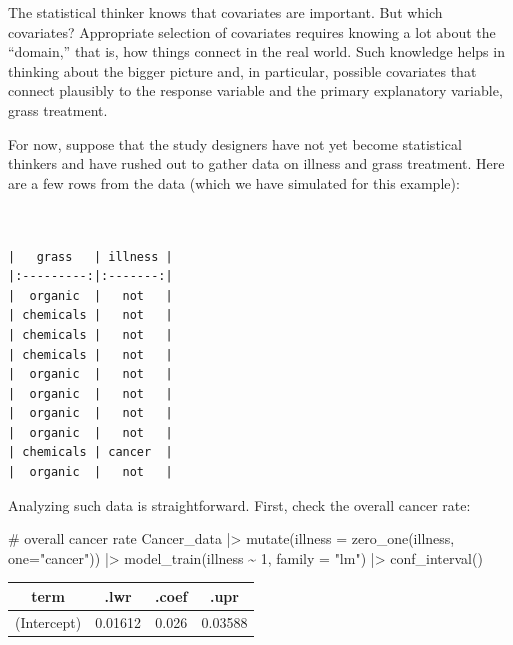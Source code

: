 \documentclass[
  letterpaper,
  DIV=11,
  numbers=noendperiod,
  oneside]{scrartcl}
\newenvironment{Shaded}{\begin{snugshade}}{\end{snugshade}}
\newcommand{\AttributeTok}[1]{\textcolor[rgb]{0.40,0.45,0.13}{#1}}
\newcommand{\CommentTok}[1]{\textcolor[rgb]{0.37,0.37,0.37}{#1}}
\newcommand{\DecValTok}[1]{\textcolor[rgb]{0.68,0.00,0.00}{#1}}
\newcommand{\FunctionTok}[1]{\textcolor[rgb]{0.28,0.35,0.67}{#1}}
\newcommand{\NormalTok}[1]{\textcolor[rgb]{0.00,0.23,0.31}{#1}}
\newcommand{\SpecialCharTok}[1]{\textcolor[rgb]{0.37,0.37,0.37}{#1}}
\newcommand{\StringTok}[1]{\textcolor[rgb]{0.13,0.47,0.30}{#1}}
\begin{document}
The statistical thinker knows that covariates are important. But which
covariates? Appropriate selection of covariates requires knowing a lot
about the ``domain,'' that is, how things connect in the real world.
Such knowledge helps in thinking about the bigger picture and, in
particular, possible covariates that connect plausibly to the response
variable and the primary explanatory variable, grass treatment.

For now, suppose that the study designers have not yet become
statistical thinkers and have rushed out to gather data on illness and
grass treatment. Here are a few rows from the data (which we have
simulated for this example):

\begin{verbatim}


|   grass   | illness |
|:---------:|:-------:|
|  organic  |   not   |
| chemicals |   not   |
| chemicals |   not   |
| chemicals |   not   |
|  organic  |   not   |
|  organic  |   not   |
|  organic  |   not   |
|  organic  |   not   |
| chemicals | cancer  |
|  organic  |   not   |
\end{verbatim}

Analyzing such data is straightforward. First, check the overall cancer
rate: {}

\begin{Shaded}
\begin{Highlighting}[]
\CommentTok{\# overall cancer rate}
\NormalTok{Cancer\_data }\SpecialCharTok{|\textgreater{}} 
  \FunctionTok{mutate}\NormalTok{(}\AttributeTok{illness =} \FunctionTok{zero\_one}\NormalTok{(illness, }\AttributeTok{one=}\StringTok{"cancer"}\NormalTok{)) }\SpecialCharTok{|\textgreater{}} 
  \FunctionTok{model\_train}\NormalTok{(illness }\SpecialCharTok{\textasciitilde{}} \DecValTok{1}\NormalTok{, }\AttributeTok{family =} \StringTok{"lm"}\NormalTok{) }\SpecialCharTok{|\textgreater{}} 
  \FunctionTok{conf\_interval}\NormalTok{()}
\end{Highlighting}
\end{Shaded}

\begin{longtable}[]{@{}cccc@{}}
\toprule\noalign{}
term & .lwr & .coef & .upr \\
\midrule\noalign{}
\endhead
\bottomrule\noalign{}
\endlastfoot
(Intercept) & 0.01612 & 0.026 & 0.03588 \\
\end{longtable}
\end{document}
